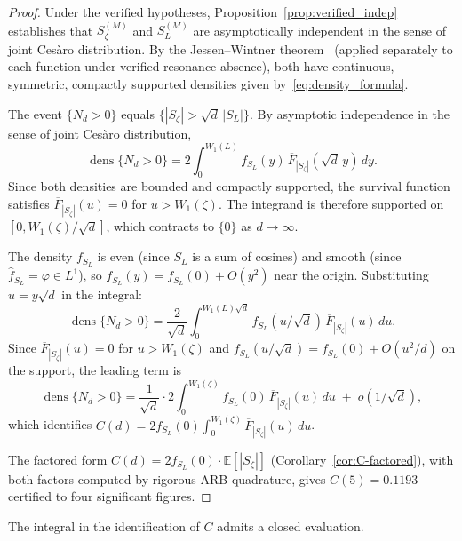 \documentclass[12pt,reqno]{amsart}
\theoremstyle{plain}
\theoremstyle{definition}
\theoremstyle{remark}
\DeclareMathOperator{\dens}{dens}
\newcommand{\E}{\mathbb{E}}
\begin{document}
\begin{proof}
Under the verified hypotheses, Proposition~\ref{prop:verified_indep} establishes that $S_\zeta^{(M)}$ and $S_L^{(M)}$ are asymptotically independent in the sense of joint Ces\`aro distribution.  By the Jessen--Wintner theorem~\cite{JessenWintner} (applied separately to each function under verified resonance absence), both have continuous, symmetric, compactly supported densities given by~\eqref{eq:density_formula}.

The event $\{N_d > 0\}$ equals $\{|S_\zeta| > \sqrt{d}\,|S_L|\}$.  By asymptotic independence in the sense of joint Ces\`aro distribution,
\[
  \dens\{N_d > 0\} = 2\int_0^{W_1(L)} f_{S_L}(y)\, \overline{F}_{|S_\zeta|}(\sqrt{d}\, y)\, dy.
\]
Since both densities are bounded and compactly supported, the survival function satisfies $\overline{F}_{|S_\zeta|}(u) = 0$ for $u > W_1(\zeta)$.  The integrand is therefore supported on $[0, W_1(\zeta)/\sqrt{d}]$, which contracts to $\{0\}$ as $d \to \infty$.

The density $f_{S_L}$ is even (since $S_L$ is a sum of cosines) and smooth (since $\hat{f}_{S_L} = \varphi \in L^1$), so $f_{S_L}(y) = f_{S_L}(0) + O(y^2)$ near the origin.  Substituting $u = y\sqrt{d}$ in the integral:
\[
  \dens\{N_d > 0\} = \frac{2}{\sqrt{d}}\int_0^{W_1(L)\sqrt{d}} f_{S_L}(u/\sqrt{d})\, \overline{F}_{|S_\zeta|}(u)\, du.
\]
Since $\overline{F}_{|S_\zeta|}(u) = 0$ for $u > W_1(\zeta)$ and $f_{S_L}(u/\sqrt{d}) = f_{S_L}(0) + O(u^2/d)$ on the support, the leading term is
\[
  \dens\{N_d > 0\} = \frac{1}{\sqrt{d}} \cdot 2\int_0^{W_1(\zeta)} f_{S_L}(0)\, \overline{F}_{|S_\zeta|}(u)\, du \;+\; o(1/\sqrt{d}),
\]
which identifies $C(d) = 2f_{S_L}(0)\int_0^{W_1(\zeta)} \overline{F}_{|S_\zeta|}(u)\, du$.

The factored form $C(d) = 2f_{S_L}(0)\cdot\E[|S_\zeta|]$ (Corollary~\ref{cor:C-factored}), with both factors computed by rigorous ARB quadrature, gives $C(5) = 0.1193$ certified to four significant figures.
\end{proof}

The integral in the identification of $C$ admits a closed evaluation.
\end{document}
